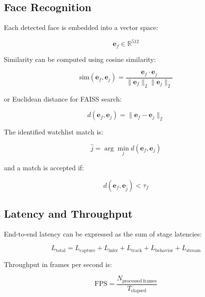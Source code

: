 \documentclass[11pt]{article}
\begin{document}
\subsection{Face Recognition}
Each detected face is embedded into a vector space:

\begin{equation}
\mathbf{e}_f \in \mathbb{R}^{512}
\end{equation}

Similarity can be computed using cosine similarity:

\begin{equation}
\mathrm{sim}(\mathbf{e}_f, \mathbf{e}_j) = \frac{\mathbf{e}_f \cdot \mathbf{e}_j}{\lVert \mathbf{e}_f \rVert_2 \lVert \mathbf{e}_j \rVert_2}
\end{equation}

or Euclidean distance for FAISS search:

\begin{equation}
d(\mathbf{e}_f, \mathbf{e}_j) = \lVert \mathbf{e}_f - \mathbf{e}_j \rVert_2
\end{equation}

The identified watchlist match is:

\begin{equation}
\hat{j} = \arg\min_j d(\mathbf{e}_f, \mathbf{e}_j)
\end{equation}

and a match is accepted if:

\begin{equation}
d(\mathbf{e}_f, \mathbf{e}_{\hat{j}}) < \tau_f
\end{equation}

\subsection{Latency and Throughput}
End-to-end latency can be expressed as the sum of stage latencies:

\begin{equation}
L_{\mathrm{total}} = L_{\mathrm{capture}} + L_{\mathrm{infer}} + L_{\mathrm{track}} + L_{\mathrm{behavior}} + L_{\mathrm{stream}}
\end{equation}

Throughput in frames per second is:

\begin{equation}
\mathrm{FPS} = \frac{N_{\mathrm{processed\ frames}}}{T_{\mathrm{elapsed}}}
\end{equation}
\end{document}
